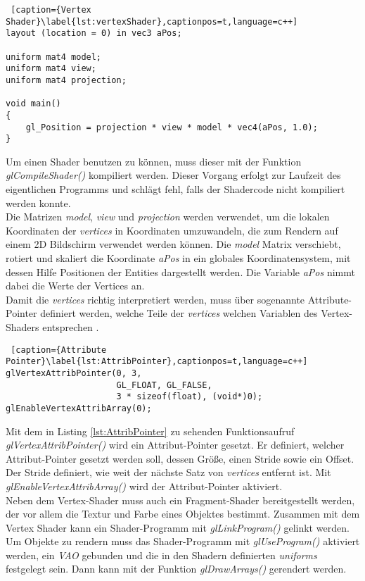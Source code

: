 \documentclass[11pt,a4paper]{article}
\begin{document}
\begin{lstlisting} [caption={Vertex Shader}\label{lst:vertexShader},captionpos=t,language=c++]
layout (location = 0) in vec3 aPos;

uniform mat4 model;
uniform mat4 view;
uniform mat4 projection;

void main()
{
	gl_Position = projection * view * model * vec4(aPos, 1.0);
}
\end{lstlisting}
\noindent
Um einen Shader benutzen zu können, muss dieser mit der Funktion \mbox{\textit{glCompileShader()}} kompiliert werden. Dieser Vorgang erfolgt zur Laufzeit des eigentlichen Programms und schlägt fehl, falls der Shadercode nicht kompiliert werden konnte.\\
Die Matrizen \mbox{\textit{model}}, \mbox{\textit{view}} und \mbox{\textit{projection}} werden verwendet, um die lokalen Koordinaten der \mbox{\textit{vertices}} in Koordinaten umzuwandeln, die zum Rendern auf einem 2D Bildschirm verwendet werden können. Die \mbox{\textit{model}} Matrix verschiebt, rotiert und skaliert die Koordinate \mbox{\textit{aPos}} in ein globales Koordinatensystem, mit dessen Hilfe Positionen der Entities dargestellt werden. Die Variable \mbox{\textit{aPos}} nimmt dabei die Werte der Vertices an.\\
Damit die \mbox{\textit{vertices}} richtig interpretiert werden, muss über sogenannte Attribute-Pointer definiert werden, welche Teile der \mbox{\textit{vertices}} welchen Variablen des Vertex-Shaders entsprechen \cite[Hello-Triangle]{LearnOpenGL}.

\begin{lstlisting} [caption={Attribute Pointer}\label{lst:AttribPointer},captionpos=t,language=c++]
glVertexAttribPointer(0, 3,
                      GL_FLOAT, GL_FALSE,
                      3 * sizeof(float), (void*)0);
glEnableVertexAttribArray(0);
\end{lstlisting}
\noindent
Mit dem in Listing \ref{lst:AttribPointer} zu sehenden Funktionsaufruf \mbox{\textit{glVertexAttribPointer()}} wird ein Attribut-Pointer gesetzt. Er definiert, welcher Attribut-Pointer gesetzt werden soll, dessen Größe, einen Stride sowie ein Offset. Der Stride definiert, wie weit der nächste Satz von \mbox{\textit{vertices}} entfernt ist. Mit \mbox{\textit{glEnableVertexAttribArray()}} wird der Attribut-Pointer aktiviert.\\
Neben dem Vertex-Shader muss auch ein Fragment-Shader bereitgestellt werden, der vor allem die Textur und Farbe eines Objektes bestimmt. Zusammen mit dem Vertex Shader kann ein Shader-Programm mit \mbox{\textit{glLinkProgram()}} gelinkt werden.\\
Um Objekte zu rendern muss das Shader-Programm mit \mbox{\textit{glUseProgram()}} aktiviert werden, ein \mbox{\textit{VAO}} gebunden und die in den Shadern definierten \mbox{\textit{uniforms}} festgelegt sein. Dann kann mit der Funktion \mbox{\textit{glDrawArrays()}} gerendert werden.
\end{document}
